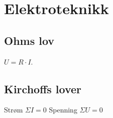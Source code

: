 \section{Elektroteknikk}
\subsection*{Ohms lov}
$U=R\cdot I$.
\subsection*{Kirchoffs lover}
Strøm $\Sigma I=0$ Spenning $\Sigma U=0$

